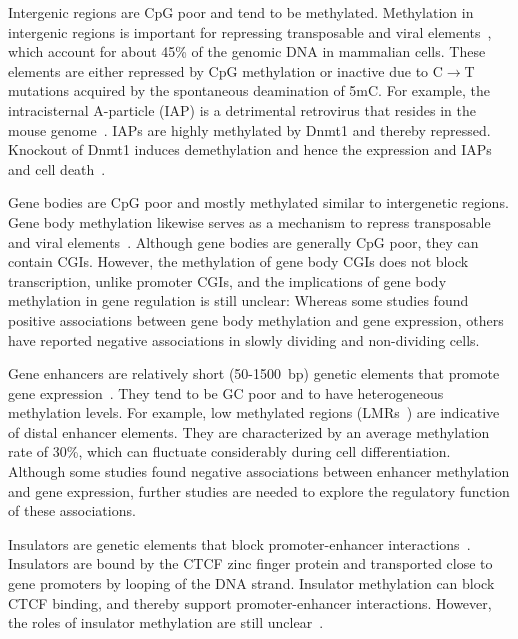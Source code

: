 Intergenic regions are CpG poor and tend to be methylated. Methylation in intergenic regions is important for repressing transposable and viral elements~\citep{moore_dna_2013,jones_functions_2012,robertson_dna_2005}, which account for about 45\% of the genomic DNA in mammalian cells. These elements are either repressed by CpG methylation or inactive due to C$\rightarrow$T mutations acquired by the spontaneous deamination of 5mC. For example, the intracisternal A-particle (IAP) is a detrimental retrovirus that resides in the mouse genome~\citep{walsh_cytosine_1999}. IAPs are highly methylated by Dnmt1 and thereby repressed. Knockout of Dnmt1 induces demethylation and hence the expression and IAPs and cell death~\citep{walsh_cytosine_1999,hutnick_repression_2010}.

Gene bodies are CpG poor and mostly methylated similar to intergenetic regions. Gene body methylation likewise serves as a mechanism to repress transposable and viral elements~\citep{moore_dna_2013,jones_functions_2012,robertson_dna_2005}. Although gene bodies are generally CpG poor, they can contain CGIs. However, the methylation of gene body CGIs does not block transcription, unlike promoter CGIs, and the implications of gene body methylation in gene regulation is still unclear: Whereas some studies found positive associations between gene body methylation and gene expression, others have reported negative associations in slowly dividing and non-dividing cells.

Gene enhancers are relatively short (50-1500~bp) genetic elements that promote gene expression~\citep{blackwood_going_1998,pennacchio_enhancers:_2013}. They tend to be GC poor and to have heterogeneous methylation levels. For example, low methylated regions (LMRs~\citep{stadler_dna-binding_2011}) are indicative of distal enhancer elements. They are characterized by an average methylation rate of 30\%, which can fluctuate considerably during cell differentiation. Although some studies found negative associations between enhancer methylation and gene expression, further studies are needed to explore the regulatory function of these associations.

Insulators are genetic elements that block promoter-enhancer interactions~\citep{burgess-beusse_insulation_2002}. Insulators are bound by the CTCF zinc finger protein and transported close to gene promoters by looping of the DNA strand. Insulator methylation can block CTCF binding, and thereby support promoter-enhancer interactions. However, the roles of insulator methylation are still unclear~\citep{moore_dna_2013,jones_functions_2012}.

